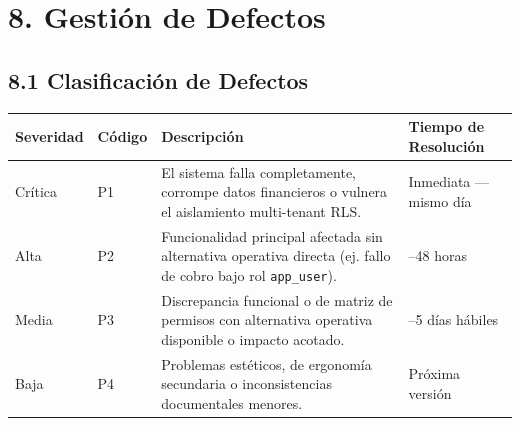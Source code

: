 \documentclass[10pt,a4paper]{article}
\newcounter{none}
\begin{document}

\section{8. Gestión de Defectos}\label{8-gestiuxf3n-de-defectos}


\subsection{8.1 Clasificación de Defectos}\label{81-clasificaciuxf3n-de-defectos}

\begingroup\singlespacing\footnotesize\setlength{\parskip}{0pt}

{\def\LTcaptype{none} %
\begin{longtable}[]{@{}
  >{\raggedright\arraybackslash}p{}
  >{\raggedright\arraybackslash}p{}
  >{\raggedright\arraybackslash}p{}
  >{\raggedright\arraybackslash}p{}@{}}
\toprule\noalign{}
\begin{minipage}[b]{\linewidth}\raggedright
Severidad
\end{minipage} & \begin{minipage}[b]{\linewidth}\raggedright
Código
\end{minipage} & \begin{minipage}[b]{\linewidth}\raggedright
Descripción
\end{minipage} & \begin{minipage}[b]{\linewidth}\raggedright
Tiempo de Resolución
\end{minipage} \\
\midrule\noalign{}
\endhead
\bottomrule\noalign{}
\endlastfoot
Crítica & P1 & El sistema falla completamente, corrompe datos financieros o vulnera el aislamiento multi-tenant RLS. & Inmediata --- mismo día \\
Alta & P2 & Funcionalidad principal afectada sin alternativa operativa directa (ej. fallo de cobro bajo rol \texttt{app\_\allowbreak{}user}). & 24--48 horas \\
Media & P3 & Discrepancia funcional o de matriz de permisos con alternativa operativa disponible o impacto acotado. & 3--5 días hábiles \\
Baja & P4 & Problemas estéticos, de ergonomía secundaria o inconsistencias documentales menores. & Próxima versión \\
\end{longtable}
}
\end{document}
